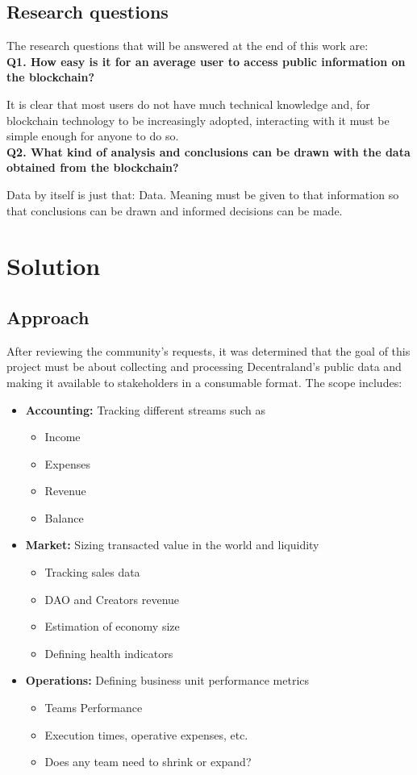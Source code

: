 \documentclass[MSE,Master,english]{twbook}%
\begin{document}
\section{Research questions\label{research}}
The research questions that will be answered at the end of this work are: \\

\textbf{Q1. How easy is it for an average user to access public information on the blockchain?}

It is clear that most users do not have much technical knowledge and, for blockchain technology to be increasingly adopted, interacting with it must be simple enough for anyone to do so. \\

\textbf{Q2. What kind of analysis and conclusions can be drawn with the data obtained from the blockchain?}

Data by itself is just that: Data. Meaning must be given to that information so that conclusions can be drawn and informed decisions can be made.

\chapter{Solution\label{solution}}
\section{Approach\label{approach}}
After reviewing the community's requests, it was determined that the goal of this project must be about collecting and processing Decentraland's public data and making it available to stakeholders in a consumable format. The scope includes:

\begin{itemize}
  \item \textbf{Accounting:} Tracking different streams such as
  \begin{itemize}
    \item Income
    \item Expenses
    \item Revenue
    \item Balance
  \end{itemize}
  \item \textbf{Market:} Sizing transacted value in the world and liquidity
  \begin{itemize}
    \item Tracking sales data
    \item DAO and Creators revenue
    \item Estimation of economy size
    \item Defining health indicators
  \end{itemize}
  \item \textbf{Operations:} Defining business unit performance metrics
  \begin{itemize}
    \item Teams Performance
    \item Execution times, operative expenses, etc.
    \item Does any team need to shrink or expand?
  \end{itemize}
\end{itemize}
\end{document}
